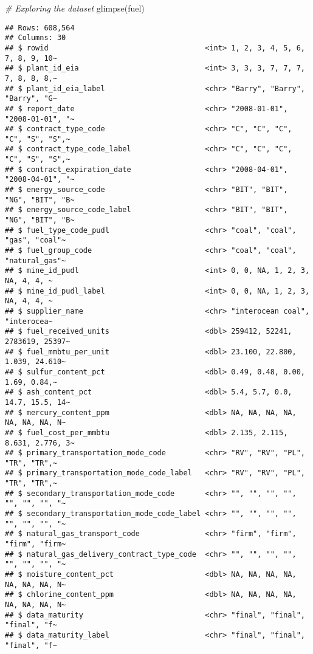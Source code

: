 \documentclass[
]{article}
\newenvironment{Shaded}{\begin{snugshade}}{\end{snugshade}}
\newcommand{\CommentTok}[1]{\textcolor[rgb]{0.56,0.35,0.01}{\textit{#1}}}
\newcommand{\FunctionTok}[1]{\textcolor[rgb]{0.00,0.00,0.00}{#1}}
\newcommand{\NormalTok}[1]{#1}
\begin{document}
\begin{Shaded}
\begin{Highlighting}[]
\CommentTok{\# Exploring the dataset}
\FunctionTok{glimpse}\NormalTok{(fuel)}
\end{Highlighting}
\end{Shaded}

\begin{verbatim}
## Rows: 608,564
## Columns: 30
## $ rowid                                    <int> 1, 2, 3, 4, 5, 6, 7, 8, 9, 10~
## $ plant_id_eia                             <int> 3, 3, 3, 7, 7, 7, 7, 8, 8, 8,~
## $ plant_id_eia_label                       <chr> "Barry", "Barry", "Barry", "G~
## $ report_date                              <chr> "2008-01-01", "2008-01-01", "~
## $ contract_type_code                       <chr> "C", "C", "C", "C", "S", "S",~
## $ contract_type_code_label                 <chr> "C", "C", "C", "C", "S", "S",~
## $ contract_expiration_date                 <chr> "2008-04-01", "2008-04-01", "~
## $ energy_source_code                       <chr> "BIT", "BIT", "NG", "BIT", "B~
## $ energy_source_code_label                 <chr> "BIT", "BIT", "NG", "BIT", "B~
## $ fuel_type_code_pudl                      <chr> "coal", "coal", "gas", "coal"~
## $ fuel_group_code                          <chr> "coal", "coal", "natural_gas"~
## $ mine_id_pudl                             <int> 0, 0, NA, 1, 2, 3, NA, 4, 4, ~
## $ mine_id_pudl_label                       <int> 0, 0, NA, 1, 2, 3, NA, 4, 4, ~
## $ supplier_name                            <chr> "interocean coal", "interocea~
## $ fuel_received_units                      <dbl> 259412, 52241, 2783619, 25397~
## $ fuel_mmbtu_per_unit                      <dbl> 23.100, 22.800, 1.039, 24.610~
## $ sulfur_content_pct                       <dbl> 0.49, 0.48, 0.00, 1.69, 0.84,~
## $ ash_content_pct                          <dbl> 5.4, 5.7, 0.0, 14.7, 15.5, 14~
## $ mercury_content_ppm                      <dbl> NA, NA, NA, NA, NA, NA, NA, N~
## $ fuel_cost_per_mmbtu                      <dbl> 2.135, 2.115, 8.631, 2.776, 3~
## $ primary_transportation_mode_code         <chr> "RV", "RV", "PL", "TR", "TR",~
## $ primary_transportation_mode_code_label   <chr> "RV", "RV", "PL", "TR", "TR",~
## $ secondary_transportation_mode_code       <chr> "", "", "", "", "", "", "", "~
## $ secondary_transportation_mode_code_label <chr> "", "", "", "", "", "", "", "~
## $ natural_gas_transport_code               <chr> "firm", "firm", "firm", "firm~
## $ natural_gas_delivery_contract_type_code  <chr> "", "", "", "", "", "", "", "~
## $ moisture_content_pct                     <dbl> NA, NA, NA, NA, NA, NA, NA, N~
## $ chlorine_content_ppm                     <dbl> NA, NA, NA, NA, NA, NA, NA, N~
## $ data_maturity                            <chr> "final", "final", "final", "f~
## $ data_maturity_label                      <chr> "final", "final", "final", "f~
\end{verbatim}
\end{document}
